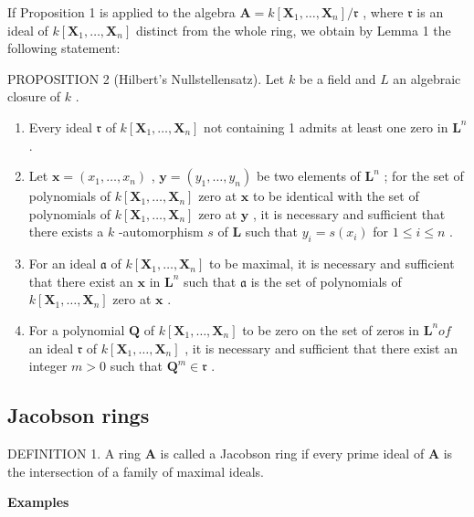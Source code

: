 If Proposition 1 is applied to the algebra \(\mathbf{A} = k[\mathbf{X}_1, \ldots, \mathbf{X}_n] / \mathfrak{r}\) , where \(\mathfrak{r}\) is an ideal of \(k[\mathbf{X}_1, \ldots, \mathbf{X}_n]\) distinct from the whole ring, we obtain by Lemma 1 the following statement:

PROPOSITION 2 (Hilbert's Nullstellensatz). Let \(k\) be a field and \(L\) an algebraic closure of \(k\) .

\begin{enumerate}
\def\labelenumi{(\roman{enumi})}
\item
  Every ideal \(\mathfrak{r}\) of \(k[\mathbf{X}_1, \ldots, \mathbf{X}_n]\) not containing 1 admits at least one zero in \(\mathbf{L}^n\) .
\item
  Let \(\mathbf{x} = (x_1, \ldots, x_n)\) , \(\mathbf{y} = (y_1, \ldots, y_n)\) be two elements of \(\mathbf{L}^n\) ; for the set of polynomials of \(k[\mathbf{X}_1, \ldots, \mathbf{X}_n]\) zero at \(\mathbf{x}\) to be identical with the set of polynomials of \(k[\mathbf{X}_1, \ldots, \mathbf{X}_n]\) zero at \(\mathbf{y}\) , it is necessary and sufficient that there exists a \(k\) -automorphism \(s\) of \(\mathbf{L}\) such that \(y_i = s(x_i)\) for \(1 \leqslant i \leqslant n\) .
\item
  For an ideal \(\mathfrak{a}\) of \(k[\mathbf{X}_1, \ldots, \mathbf{X}_n]\) to be maximal, it is necessary and sufficient that there exist an \(\mathbf{x}\) in \(\mathbf{L}^n\) such that \(\mathfrak{a}\) is the set of polynomials of \(k[\mathbf{X}_1, \ldots, \mathbf{X}_n]\) zero at \(\mathbf{x}\) .
\item
  For a polynomial \(\mathbf{Q}\) of \(k[\mathbf{X}_1, \ldots, \mathbf{X}_n]\) to be zero on the set of zeros in \(\mathbf{L}^n of\) an ideal \(\mathfrak{r}\) of \(k[\mathbf{X}_1, \ldots, \mathbf{X}_n]\) , it is necessary and sufficient that there exist an integer \(m > 0\) such that \(\mathbf{Q}^m \in \mathfrak{r}\) .
\end{enumerate}

\subsection{Jacobson rings}

DEFINITION 1. A ring \(\mathbf{A}\) is called a Jacobson ring if every prime ideal of \(\mathbf{A}\) is the intersection of a family of maximal ideals.

\textbf{Examples}\par

